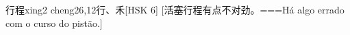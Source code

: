 \begin{EntryWithPhonetic}{行程}{xing2 cheng2}{6,12}{⾏、⽲}[HSK 6]
  [活塞行程有点不对劲。===Há algo errado com o curso do pistão.]
\end{EntryWithPhonetic}
